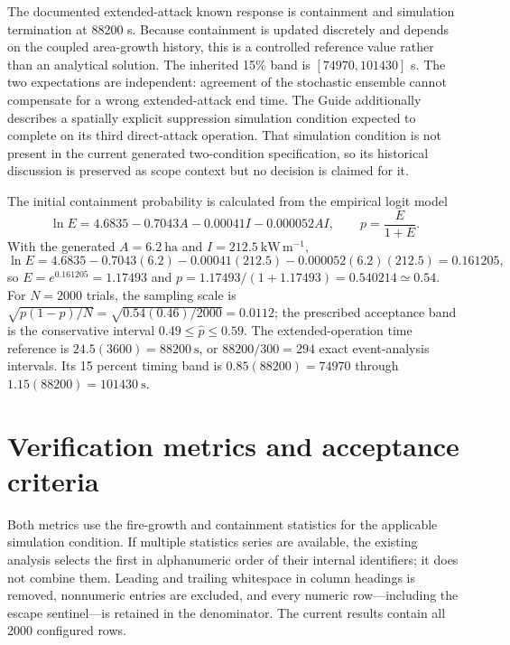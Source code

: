 The documented extended-attack known response is containment and simulation termination at 88200 s. Because containment is updated discretely and depends on the coupled area-growth history, this is a controlled reference value rather than an analytical solution. The inherited 15\% band is $[74970,101430]$ s. The two expectations are independent: agreement of the stochastic ensemble cannot compensate for a wrong extended-attack end time. The Guide additionally describes a spatially explicit suppression simulation condition expected to complete on its third direct-attack operation. That simulation condition is not present in the current generated two-condition specification, so its historical discussion is preserved as scope context but no decision is claimed for it.

The initial containment probability is calculated from the empirical
logit model
\[
 \ln E=4.6835-0.7043A-0.00041I-0.000052AI,\qquad
 p=\frac{E}{1+E}.
\]
With the generated \(A=6.2~\mathrm{ha}\) and
\(I=212.5~\mathrm{kW\,m^{-1}}\),
\[
 \ln E=4.6835-0.7043(6.2)-0.00041(212.5)
       -0.000052(6.2)(212.5)=0.161205,
\]
so \(E=e^{0.161205}=1.17493\) and
\(p=1.17493/(1+1.17493)=0.540214\simeq0.54\).
For \(N=2000\) trials, the sampling scale is
\(\sqrt{p(1-p)/N}=\sqrt{0.54(0.46)/2000}=0.0112\); the prescribed
acceptance band is the conservative interval \(0.49\leq\hat p\leq0.59\).
The extended-operation time reference is
\(24.5(3600)=88200~\mathrm{s}\), or \(88200/300=294\) exact
event-analysis intervals.  Its 15 percent timing band is
\(0.85(88200)=74970\) through \(1.15(88200)=101430~\mathrm{s}\).

\section{Verification metrics and acceptance criteria}

Both metrics use the fire-growth and containment statistics for the applicable
simulation condition. If multiple statistics series are available, the existing
analysis selects the first in alphanumeric order of their internal identifiers;
it does not combine them. Leading and trailing whitespace in column headings
is removed, nonnumeric entries are excluded, and every numeric row---including
the escape sentinel---is retained in the denominator. The current results
contain all 2000 configured rows.

